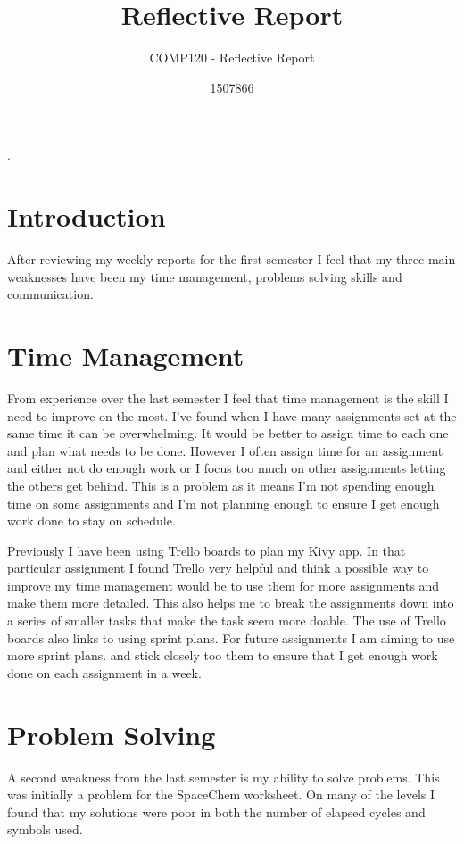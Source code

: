 \documentclass{scrartcl}
\title{Reflective Report}
\subtitle{COMP120 - Reflective Report}
\author{1507866}
\begin{document}
	
	\maketitle
	
	.
	
	\section{Introduction}
	After reviewing my weekly reports for the first semester I feel that my three main weaknesses have been my time management, problems solving skills and communication. 
	
	\section{Time Management}
From experience over the last semester I feel that time management is the skill I need to improve on the most. I've found when I have many assignments set at the same time it can be overwhelming. It would be better to assign time to each one and plan what needs to be done. However I often assign time for an assignment and either not do enough work or I focus too much on other assignments letting the others get behind. This is a problem as it means I'm not spending enough time on some assignments and I'm not planning enough to ensure I get enough work done to stay on schedule.

Previously I have been using Trello boards to plan my Kivy app. In that particular assignment I found Trello very helpful and think a possible way to improve my time management would be to use them for more assignments and make them more detailed. This also helps me to break the assignments down into a series of smaller tasks that make the task seem more doable. The use of Trello boards also links to using sprint plans. For future assignments I am aiming to use more sprint plans.  and stick closely too them to ensure that I get enough work done on each assignment in a week.
	

	
	\section{Problem Solving}
A second weakness from the last semester is my ability to solve problems.  This was initially a problem for the SpaceChem worksheet. On many of the levels I found that my solutions were poor in both the number of elapsed cycles and symbols used.
\end{document}
